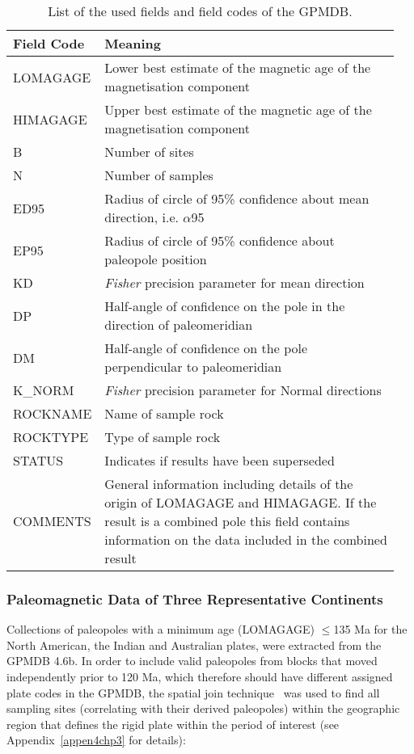 \begin{table}[!ht]
  \centering
  \caption{List of the used fields and field codes of the GPMDB.}\label{tab-fld}
  \begin{tabular}{p{0.16\linewidth} p{0.79\linewidth}}
    \toprule
    Field Code & Meaning \\ \midrule
    LOMAGAGE & Lower best estimate of the magnetic age of the magnetisation component \\
    HIMAGAGE & Upper best estimate of the magnetic age of the magnetisation component \\
    B & Number of sites \\
    N & Number of samples \\
    ED95 & Radius of circle of 95\% confidence about mean direction, i.e. $\alpha$95 \\
    EP95 & Radius of circle of 95\% confidence about paleopole position \\
    KD & \emph{Fisher} precision parameter for mean direction \\
    DP & Half-angle of confidence on the pole in the direction of paleomeridian \\
    DM & Half-angle of confidence on the pole perpendicular to paleomeridian \\
    K\_NORM & \emph{Fisher} precision parameter for Normal directions \\
    ROCKNAME & Name of sample rock \\
    ROCKTYPE & Type of sample rock \\
    STATUS & Indicates if results have been superseded \\
    COMMENTS & General information including details of the origin of LOMAGAGE
      and HIMAGAGE\@. If the result is a combined pole this field contains
      information on the data included in the combined result \\
    \bottomrule
  \end{tabular}
\end{table}

\subsubsection{Paleomagnetic Data of Three Representative Continents}

Collections of paleopoles with a minimum age (LOMAGAGE) $\leq$135 Ma for the
North American, the Indian and Australian plates, were extracted from the GPMDB
4.6b. In order to include valid paleopoles from blocks that moved independently
prior to 120 Ma, which therefore should have different assigned plate codes in
the GPMDB, the spatial join technique~\citep{J07} was used to find all sampling
sites (correlating with their derived paleopoles) within the geographic region
that defines the rigid plate within the period of interest (see
Appendix~\ref{appen4chp3} for details):

